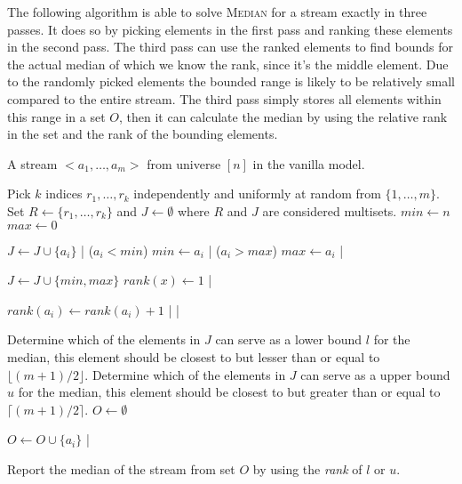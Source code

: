 The following algorithm is able to solve \textsc{Median} for a stream exactly in three passes.
It does so by picking elements in the first pass and ranking these elements in the second pass.
The third pass can use the ranked elements to find bounds for the actual median of which we know the rank, since it's the middle element.
Due to the randomly picked elements the bounded range is likely to be relatively small compared to the entire stream.
The third pass simply stores all elements within this range in a set $O$, then it can calculate the median by using the relative rank in the set and the rank of the bounding elements.

\begin{sourcecode}
A stream $<a_1, \ldots , a_m>$ from universe $[n]$ in the vanilla model.
\silend

Pick $k$ indices $r_1, \ldots , r_k$ independently and uniformly at random from $\{1, \ldots , m\}$.
Set $R \leftarrow \{r_1, \ldots , r_k\}$ and $J \leftarrow \emptyset$ where $R$ and $J$ are considered multisets.
$\textit{min} \leftarrow n$
$\textit{max} \leftarrow 0$
\silend

	$J \leftarrow J \cup \{a_i\}$
|
\qif($a_i < \textit{min}$)
	$\textit{min} \leftarrow a_i$
|
\qif($a_i > \textit{max}$)
	$\textit{max} \leftarrow a_i$
|
\silend

$J \leftarrow J \cup \{min, max\}$
	$\textit{rank}(x) \leftarrow 1$
|
\silend

		$\textit{rank}(a_i) \leftarrow \textit{rank}(a_i) + 1$
	|
|
\silend

Determine which of the elements in $J$ can serve as a lower bound $l$ for the median, this element should be closest to but lesser than or equal to $\lfloor (m+1)/2 \rfloor$.
Determine which of the elements in $J$ can serve as a upper bound $u$ for the median, this element should be closest to but greater than or equal to $\lceil (m+1)/2 \rceil$.
$O \leftarrow \emptyset$
\silend

	$O \leftarrow O \cup \{a_i\}$
|
\silend

Report the median of the stream from set $O$ by using the \textit{rank} of $l$ or $u$.
\qend
\end{sourcecode}

